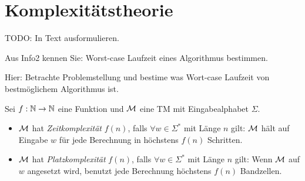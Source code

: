 \section[Komplexitätstheorie]{Komplexitätstheorie}

{\color{red} TODO: In Text ausformulieren.

Aus Info2 kennen Sie: Worst-case Laufzeit eines Algorithmus bestimmen.

Hier: Betrachte Problemstellung und bestime was Wort-case Laufzeit von bestmöglichem Algorithmus ist.

}


\begin{Def}
Sei $f:\mathbb{N}\rightarrow\mathbb{N}$ eine Funktion und $\mathcal{M}$ eine \ac{TM} mit Eingabealphabet $\Sigma$.
\begin{itemize}
 \item $\mathcal{M}$ hat \emph{Zeitkomplexität} $f(n)$, falls $\forall w\in\Sigma^*$ mit Länge $n$ gilt: $\mathcal{M}$ hält auf Eingabe $w$ für jede Berechnung in höchstens $f(n)$ Schritten.
 \item $\mathcal{M}$ hat \emph{Platzkomplexität} $f(n)$, falls $\forall w\in\Sigma^*$ mit Länge $n$ gilt: Wenn $\mathcal{M}$ auf $w$ angesetzt wird, benutzt jede Berechnung höchstens $f(n)$ Bandzellen.
 \qedhere
\end{itemize}
\end{Def}


